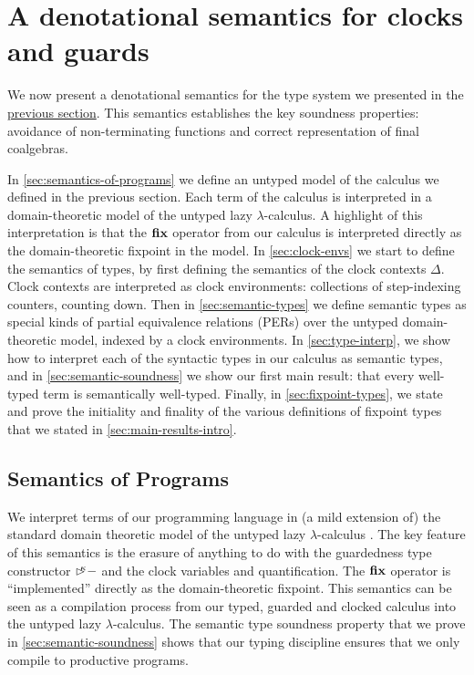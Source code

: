 \section{A denotational semantics for clocks and guards}
\label{sec:semantics}

We now present a denotational semantics for the type system we
presented in the \hyperref[sec:type-system]{previous section}. This
semantics establishes the key soundness properties: avoidance of
non-terminating functions and correct representation of final
coalgebras.

In \autoref{sec:semantics-of-programs} we define an untyped model of
the calculus we defined in the previous section. Each term of the
calculus is interpreted in a domain-theoretic model of the untyped
lazy $\lambda$-calculus. A highlight of this interpretation is that
the $\textbf{fix}$ operator from our calculus is interpreted directly as
the domain-theoretic fixpoint in the model. In
\autoref{sec:clock-envs} we start to define the semantics of types, by
first defining the semantics of the clock contexts $\Delta$. Clock
contexts are interpreted as clock environments: collections of
step-indexing counters, counting down. Then in
\autoref{sec:semantic-types} we define semantic types as special kinds
of partial equivalence relations (PERs) over the untyped
domain-theoretic model, indexed by a clock environments. In
\autoref{sec:type-interp}, we show how to interpret each of the
syntactic types in our calculus as semantic types, and in
\autoref{sec:semantic-soundness} we show our first main result: that
every well-typed term is semantically well-typed. Finally, in
\autoref{sec:fixpoint-types}, we state and prove the initiality and
finality of the various definitions of fixpoint types that we stated
in \autoref{sec:main-results-intro}.

\subsection{Semantics of Programs}\label{sec:semantics-of-programs}

We interpret terms of our programming language in (a mild extension
of) the standard domain theoretic model of the untyped lazy
$\lambda$-calculus \cite{PittsAM:compavm}. The key feature of this
semantics is the erasure of anything to do with the guardedness type
constructor $\mathord{\rhd\kern-0.4em^{\kappa}}-$ and the clock variables and
quantification. The $\textbf{fix}$ operator is ``implemented'' directly as
the domain-theoretic fixpoint. This semantics can be seen as a
compilation process from our typed, guarded and clocked calculus into
the untyped lazy $\lambda$-calculus. The semantic type soundness
property that we prove in \autoref{sec:semantic-soundness} shows that
our typing discipline ensures that we only compile to productive
programs.

